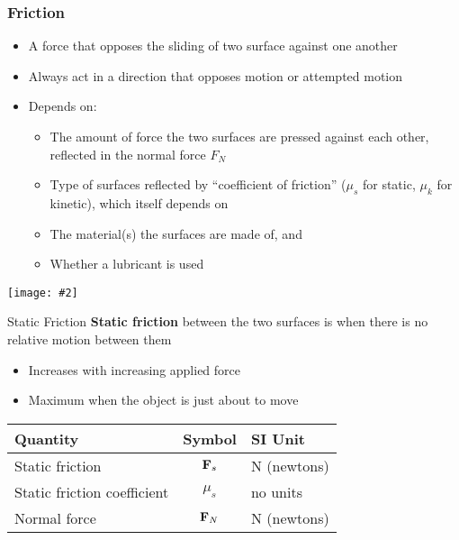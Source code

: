 \documentclass[12pt,compress,aspectratio=169]{beamer}
\newcommand{\pic}[2]{\texttt{[image: \#2]}}
\newcommand{\mb}[1]{\ensuremath\mathbf{#1}}
\newcommand{\eq}[2]{\vspace{#1}{\Large\begin{displaymath}#2\end{displaymath}}}
\begin{document}
\begin{frame}
  \frametitle{Friction}
  \begin{itemize}
  \item A force that opposes the sliding of two surface against one another
  \item Always act in a direction that opposes motion or attempted motion
  \item Depends on:
    \begin{itemize}
    \item The amount of force the two surfaces are pressed against each other,
      reflected in the normal force $F_N$
    \item Type of surfaces reflected by ``coefficient of friction''
      ($\mu_s$ for static, $\mu_k$ for kinetic), which itself depends on
    \item The material(s) the surfaces are made of, and
    \item Whether a lubricant is used
    \end{itemize}
  \end{itemize}
  \begin{center}
    \vspace{-.1in}
    \pic{.5}{graphics/friction.jpg}
  \end{center}
\end{frame}



\begin{frame}{Static Friction}
  \textbf{Static friction} between the two surfaces is when there is no
  relative motion between them
  \begin{itemize}
  \item Increases with increasing applied force
  \item Maximum when the object is just about to move
  \end{itemize}

  \eq{-.2in}{\boxed{F_s\leq\mu_sF_N}}

  \begin{center}
    \begin{tabular}{l|c|l}
      \rowcolor{pink}
      \textbf{Quantity} & \textbf{Symbol} & \textbf{SI Unit} \\ \hline
      Static friction  & $\mb{F}_s$ & \si{\newton} (newtons)\\
      Static friction coefficient & $\mu_s$ & no units \\
      Normal force     & $\mb{F}_N$ & \si{\newton} (newtons)
    \end{tabular}
  \end{center}
\end{frame}
\end{document}
